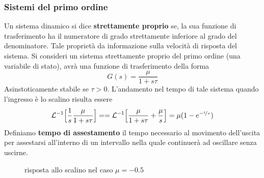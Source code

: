 \documentclass[10pt, letterpaper]{report}
\begin{document}
\subsubsection{Sistemi del primo ordine}
 Un sistema dinamico si dice \textbf{strettamente proprio} 
se, la sua funzione di trasferimento ha il numeratore di grado 
strettamente inferiore al grado del denominatore. 
Tale proprietà da informazione sulla velocità di risposta 
del sistema.\acc
Si consideri un sistema strettamente proprio del primo ordine (una variabile di stato), 
avrà una funzione di trasferimento della forma 
$$ G(s)=\frac{\mu}{1+s\tau}$$
Asinstoticamente stabile se $\tau>0$. L'andamento nel tempo di tale sistema quando l'ingresso è 
lo scalino risulta essere 
$$ \mathcal{L}^{-1}\Big[\frac{1}{s}\frac{\mu}{1+s\tau}\Big]=
=\mathcal{L}^{-1}\Big[\frac{\mu}{1+s\tau}+\frac{\mu}{s}\Big]=
\mu(1-e^{-\nicefrac{t}{\tau}})$$
Definiamo \textbf{tempo di assestamento} il 
tempo necessario al movimento dell'uscita per 
assestarsi all'interno di un intervallo nella quale continuerà 
ad oscillare senza uscirne.\begin{center}
    \begin{figure}[h!]
        \centering
            \caption{risposta allo scalino nel caso $\mu = -0.5$}
    \end{figure}
    \end{center}
\end{document}
